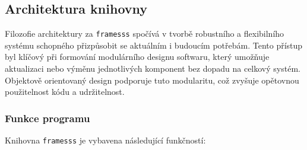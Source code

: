 \subsection{Architektura knihovny}

Filozofie architektury za \texttt{framesss} spočívá v tvorbě robustního a flexibilního systému schopného přizpůsobit se aktuálním i budoucím potřebám. Tento přístup byl klíčový při formování modulárního designu softwaru, který umožňuje aktualizaci nebo výměnu jednotlivých komponent bez dopadu na celkový systém. Objektově orientovaný design podporuje tuto modularitu, což zvyšuje opětovnou použitelnost kódu a udržitelnost.

\subsubsection{Funkce programu}

Knihovna \texttt{framesss} je vybavena následující funkčností:

